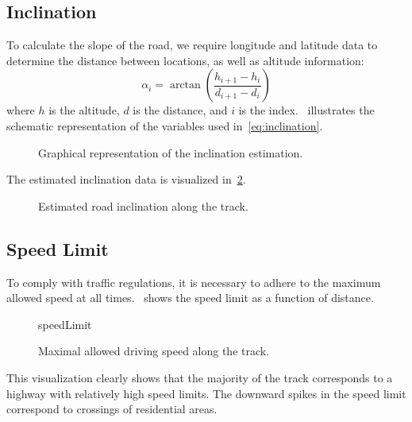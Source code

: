\subsection{Inclination}
\label{sec:modelingInclination}
To calculate the slope of the road, we require longitude and latitude data to determine the distance between locations, as well as altitude information:
\begin{equation}
	\alpha_i = \arctan\left(\frac{h_{i+1} - h_i}{d_{i+1} - d_i} \right) \label{eq:inclination}
\end{equation}
where $h$ is the altitude, $d$ is the distance, and $i$ is the index.~ illustrates the schematic representation of the variables used in~\cref{eq:inclination}.
\begin{figure}[htbp]
	\centering
	
	\caption{Graphical representation of the inclination estimation.}
	\label{fig:inclinationTriangle}
\end{figure}

The estimated inclination data is visualized in~\cref{fig:inclination}.
\begin{figure}[htbp]
	\centering
	
	\caption{Estimated road inclination along the track.}
	\label{fig:inclination}
\end{figure}


\subsection{Speed Limit}
To comply with traffic regulations, it is necessary to adhere to the maximum allowed speed at all times.~ shows the speed limit as a function of distance.
\begin{figure}[htbp]
	\centering
	\begin{externalize}{speedLimit}
		
	\end{externalize}
	\caption{Maximal allowed driving speed along the track.}
	\label{fig:speedLimit}
\end{figure}
This visualization clearly shows that the majority of the track corresponds to a highway with relatively high speed limits. The downward spikes in the speed limit correspond to crossings of residential areas.


